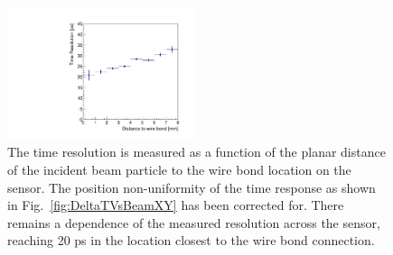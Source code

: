 \begin{figure}[htbp]
\centering 
\includegraphics[width=0.49\textwidth]{figures/TimeResolutionVsR.pdf} 
\caption{ The time resolution is measured as a function of the planar distance of the 
incident beam particle to the wire bond location on the sensor. The position non-uniformity
of the time response as shown in Fig.~\ref{fig:DeltaTVsBeamXY} has been corrected for. There 
remains a dependence of the measured resolution across the sensor, reaching 20 ps in the location
closest to the wire bond connection.}
\label{fig:TimeResolutionVsR}
\end{figure}




